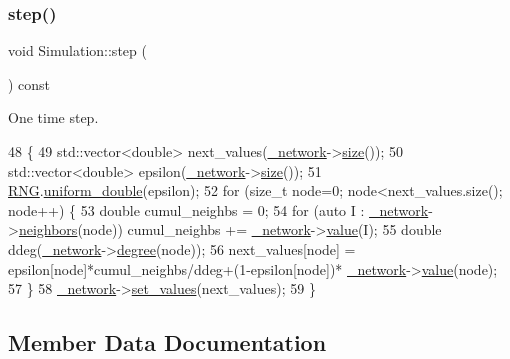 \subsubsection{\texorpdfstring{step()}{step()}}
{\footnotesize\ttfamily void Simulation\+::step (\begin{DoxyParamCaption}{ }\end{DoxyParamCaption}) const\hspace{0.3cm}{\ttfamily [private]}}

One time step. 
\begin{DoxyCode}
48                             \{
49     std::vector<double> next\_values(\mbox{\hyperlink{classSimulation_a5f1d8152b13bc4640c8a3fddcfe7eae9}{\_network}}->\mbox{\hyperlink{classNetwork_a41c54d12d861883170b5c5abca3a7bc8}{size}}());
50     std::vector<double> epsilon(\mbox{\hyperlink{classSimulation_a5f1d8152b13bc4640c8a3fddcfe7eae9}{\_network}}->\mbox{\hyperlink{classNetwork_a41c54d12d861883170b5c5abca3a7bc8}{size}}());
51     \mbox{\hyperlink{main_8cpp_aa68627d02426951087dcb2ed1f32099c}{RNG}}.\mbox{\hyperlink{classRandomNumbers_ae226c129494f9055ac37ed1af943d010}{uniform\_double}}(epsilon);
52     \textcolor{keywordflow}{for} (\textcolor{keywordtype}{size\_t} node=0; node<next\_values.size(); node++) \{
53         \textcolor{keywordtype}{double} cumul\_neighbs = 0;
54         \textcolor{keywordflow}{for} (\textcolor{keyword}{auto} I : \mbox{\hyperlink{classSimulation_a5f1d8152b13bc4640c8a3fddcfe7eae9}{\_network}}->\mbox{\hyperlink{classNetwork_a6b590aa55ca6e568d209f7c90fbb514e}{neighbors}}(node)) cumul\_neighbs += 
      \mbox{\hyperlink{classSimulation_a5f1d8152b13bc4640c8a3fddcfe7eae9}{\_network}}->\mbox{\hyperlink{classNetwork_a9b9cb94c0af24ce5417d840727fb5ad3}{value}}(I);
55         \textcolor{keywordtype}{double} ddeg(\mbox{\hyperlink{classSimulation_a5f1d8152b13bc4640c8a3fddcfe7eae9}{\_network}}->\mbox{\hyperlink{classNetwork_a7bd299baab15f2652fa697b1afde3977}{degree}}(node));
56         next\_values[node] = epsilon[node]*cumul\_neighbs/ddeg+(1-epsilon[node])*
      \mbox{\hyperlink{classSimulation_a5f1d8152b13bc4640c8a3fddcfe7eae9}{\_network}}->\mbox{\hyperlink{classNetwork_a9b9cb94c0af24ce5417d840727fb5ad3}{value}}(node);
57     \}
58     \mbox{\hyperlink{classSimulation_a5f1d8152b13bc4640c8a3fddcfe7eae9}{\_network}}->\mbox{\hyperlink{classNetwork_aee0b1927ab5693cf90a00fe4d505c427}{set\_values}}(next\_values);
59 \}
\end{DoxyCode}


\subsection{Member Data Documentation}
\mbox{\label{classSimulation_a5f1d8152b13bc4640c8a3fddcfe7eae9}} 
